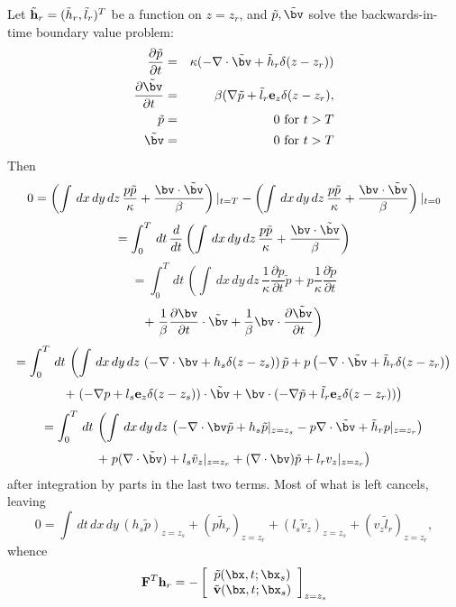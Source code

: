 Let $\tilde{\bf h}_r=(\tilde{h}_r,\tilde{l}_r)^T$ be a function on $z=z_r$, 
and 
$\tilde{p},\tilde{\bv}$ solve the backwards-in-time boundary value problem:
\begin{eqnarray}
\label{eqn:faweadj}
\frac{\partial \tilde{p}}{\partial t} & = & \kappa (-\nabla \cdot \tilde{\bv} + 
 \tilde{h}_r \delta(z-z_r))\nonumber \\
\frac{\partial \tilde{\bv}}{\partial t} & = & \beta (\nabla \tilde{p} + \tilde{l}_r{\bf e}_z\delta(z-z_r),\nonumber \\
\tilde{p} & =& 0 \mbox{ for } t>T\nonumber\\ 
\tilde{\bv} & = & 0 \mbox{ for } t>T 
\end{eqnarray} 
Then
\[
0 = 
\left(\int\, dx\,dy\,dz\, \frac{p \tilde{p}}{\kappa} +  
\frac{\bv \cdot \tilde{\bv}}{\beta} \right)|_{t=T}
-
\left(\int\, dx\,dy\,dz\, \frac{p \tilde{p}}{\kappa} +  \frac{\bv \cdot \tilde{\bv}}{\beta} \right)|_{t=0}
\]
\[
= 
\int_{0}^{T} \,dt\, \frac{d}{dt}\left(\int\, dx\,dy\,dz\, \frac{p \tilde{p}}{\kappa} +  \frac{\bv \cdot \tilde{\bv}}{\beta} \right)
\]
\[
= 
\int_{0}^{T} \,dt\, \left(\int\, dx\,dy\,dz\, \frac{1}{\kappa} \frac{\partial p}{\partial t} \tilde {p} +  p \frac{1}{\kappa}\frac{\partial \tilde{p}}{\partial t} \right.
\]
\[
+
\left. \frac{1}{\beta} \frac{\partial \bv}{\partial t} \cdot \tilde{\bv} + \frac{1}{\beta} \bv \cdot \frac{\partial \tilde{\bv}}{\partial t} \right)
\]
\[
= 
\int_{0}^{T} \,dt\, \left(\int\, dx\,dy\,dz\, \left(- \nabla \cdot \bv + 
 h_s \delta(z-z_s)\right) \tilde{p} + p \left(- \nabla \cdot \tilde{\bv} + 
 \tilde{h}_r \delta(z-z_r)\right) \right.
\]
\[
+
\left.  (- \nabla p + l_s{\bf e}_z\delta(z-z_s)) \cdot \tilde{\bv} + \bv \cdot (-\nabla \tilde{p} + \tilde{l}_r{\bf e}_z\delta(z-z_r)) \right)
\]
\[
= 
\int_{0}^{T}\,dt\, \left(\int\, dx\,dy\,dz\, \left(- \nabla \cdot \bv \tilde{p} + 
 h_s\tilde{p}|_{z=z_s} - p\nabla \cdot \tilde{\bv} + 
 \tilde{h}_r p|_{z=z_r}\right) \right.
\]
\[
+
\left.  p (\nabla \cdot \tilde{\bv}) + l_s \tilde{v}_z|_{z=z_r}+ (\nabla \cdot \bv) \tilde{p}  + l_r  v_z|_{z=z_r}\right)
\]
after integration by parts in the last two terms. Most of what is left cancels, leaving 
\[
0 = \int\,dt\,dx\,dy\, (h_s \tilde{p})_{z=z_s} + (p  \tilde{h}_r)_{z=z_r} + (l_s\tilde{v}_z)_{z=z_s} + (v_z \tilde{l}_r)_{z=z_r},
\]
whence
\begin{equation}
\label{eqn:fadj}
 {\bf F}^T {\bf h}_r = -\left[
\begin{array}{c}
\tilde{p}(\bx,t;\bx_s)\\
\tilde{\bf v}(\bx,t;\bx_s)
\end{array}
\right]_{z=z_s}
\end{equation}

